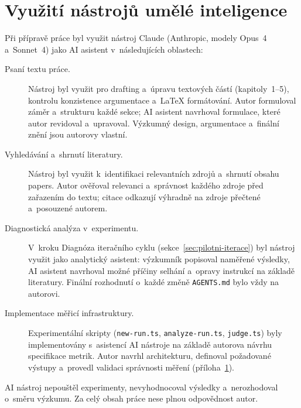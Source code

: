 \chapter{Využití nástrojů umělé inteligence}
\label{app:ai-disclosure}

Při přípravě práce byl využit nástroj Claude (Anthropic, modely Opus~4
a~Sonnet~4) jako AI asistent v~následujících oblastech:

\begin{description}
    \item[Psaní textu práce.]
        Nástroj byl využit pro drafting a~úpravu textových částí
        (kapitoly~1--5), kontrolu konzistence argumentace a~LaTeX
        formátování. Autor formuloval záměr a~strukturu každé sekce;
        AI asistent navrhoval formulace, které autor revidoval
        a~upravoval. Výzkumný design, argumentace a~finální znění
        jsou autorovy vlastní.

    \item[Vyhledávání a~shrnutí literatury.]
        Nástroj byl využit k~identifikaci relevantních zdrojů
        a~shrnutí obsahu papers. Autor ověřoval relevanci a~správnost
        každého zdroje před zařazením do textu; citace odkazují
        výhradně na zdroje přečtené a~posouzené autorem.

    \item[Diagnostická analýza v~experimentu.]
        V~kroku Diagnóza iteračního cyklu (sekce~\ref{sec:pilotni-iterace})
        byl nástroj využit jako analytický asistent: výzkumník
        popisoval naměřené výsledky, AI asistent navrhoval možné
        příčiny selhání a~opravy instrukcí na základě literatury.
        Finální rozhodnutí o~každé změně \texttt{AGENTS.md} bylo
        vždy na autorovi.

    \item[Implementace měřicí infrastruktury.]
        Experimentální skripty (\texttt{new-run.ts},
        \texttt{analyze-run.ts}, \texttt{judge.ts}) byly
        implementovány s~asistencí AI nástroje na základě autorova
        návrhu specifikace metrik. Autor navrhl architekturu,
        definoval požadované výstupy a~provedl validaci správnosti
        měření (příloha~\ref{app:ai-disclosure}).
\end{description}

\noindent
AI nástroj nepouštěl experimenty, nevyhodnocoval výsledky
a~nerozhodoval o~směru výzkumu. Za celý obsah práce nese
plnou odpovědnost autor.
